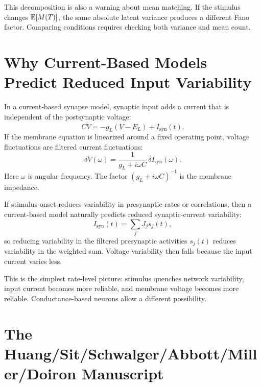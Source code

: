 This decomposition is also a warning about mean matching. If the stimulus changes $\mathbb{E}[M(T)]$, the same absolute latent variance produces a different Fano factor. Comparing conditions requires checking both variance and mean count.

\section{Why Current-Based Models Predict Reduced Input Variability}
\label{sec:why-current-based-models-predict-reduced-input-variability}

In a current-based synapse model, synaptic input adds a current that is independent of the postsynaptic voltage:
%
\begin{equation}
  C\dot V
  =
  -g_L(V-E_L)
  +
  I_{\mathrm{syn}}(t).
  \label{eq:current-based-voltage}
\end{equation}
%
If the membrane equation is linearized around a fixed operating point, voltage fluctuations are filtered current fluctuations:
%
\begin{equation}
  \delta V(\omega)
  =
  \frac{1}{g_L+i\omega C}\,
  \delta I_{\mathrm{syn}}(\omega).
  \label{eq:current-based-impedance}
\end{equation}
%
Here $\omega$ is angular frequency. The factor $(g_L+i\omega C)^{-1}$ is the membrane impedance.

If stimulus onset reduces variability in presynaptic rates or correlations, then a current-based model naturally predicts reduced synaptic-current variability:
%
\begin{equation}
  I_{\mathrm{syn}}(t)
  =
  \sum_j J_j s_j(t),
  \label{eq:current-based-syn-input}
\end{equation}
%
so reducing variability in the filtered presynaptic activities $s_j(t)$ reduces variability in the weighted sum. Voltage variability then falls because the input current varies less.

This is the simplest rate-level picture: stimulus quenches network variability, input current becomes more reliable, and membrane voltage becomes more reliable. Conductance-based neurons allow a different possibility.

\section{The Huang/Sit/Schwalger/Abbott/Miller/Doiron Manuscript}
\label{sec:huang-sit-schwalger-abbott-miller-doiron-manuscript}

